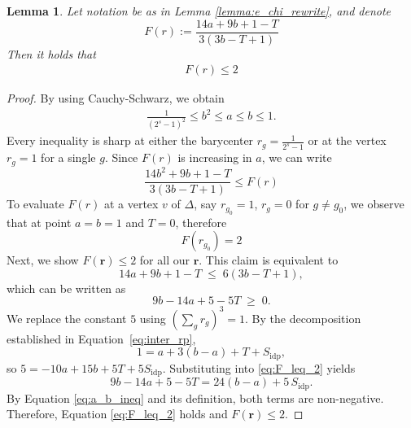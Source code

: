 \documentclass[12pt,twoside,]{amsart}
\theoremstyle{plain}
\newtheorem{lemma}[theorem]{Lemma}
\theoremstyle{definition}
\begin{document}
\begin{lemma}\label{lemma:inq_Fr}
Let notation be as in Lemma \ref{lemma:e_chi_rewrite}, 
and denote
\[
F(r):= \frac{14a+9b+1-T}{3(3b-T+1)}
\]
Then it holds that
 \begin{align*} 
F(r)
\leq 
2
 \end{align*}  
 \end{lemma}
\begin{proof}
By using Cauchy-Schwarz, we obtain 
\begin{align}\label{eq:a_b_ineq}
  \frac{1}{(2^s-1)^2} \leq b^2 \leq a \leq b \leq 1.
\end{align}
Every inequality is sharp at either the barycenter
$r_g = \frac{1}{2^s-1}$ or at the vertex 
$r_g =1 $ for a single $g$.
Since $F(r)$ is increasing in $a$, we can write
\[
\frac{14b^2+9b+1-T}{3(3b-T+1)} \leq F(r) 
\]
To evaluate $F(r)$ at a vertex $v$ of $\Delta$, say $r_{g_0}=1$, $r_g=0$ for $g\ne g_0$, we observe that at point $a = b =1$ and $T=0$, therefore
\[
F(r_{g_0}) = 2 
\]
Next, we show $F(\mathbf{r}) \leq 2$ for all our $\mathbf{r}$. This claim  is equivalent to
\[
14a + 9b + 1 - T \;\leq\; 6(3b - T + 1),
\]
which can be written as
\begin{equation}\label{eq:F_leq_2}
9b - 14a + 5 - 5T \;\geq\; 0.
\end{equation}
We replace the constant $5$ using $\left(\sum_{g} r_g\right)^3 = 1$. By the decomposition established in Equation~\eqref{eq:inter_rp},
\[
1 = a + 3(b - a) + T + S_{\mathrm{idp}},
\]
so $5 = -10a + 15b + 5T + 5S_{\mathrm{idp}}$. Substituting into \eqref{eq:F_leq_2} yields
\[
9b - 14a + 5 - 5T = 24(b - a) + 5\,S_{\mathrm{idp}}.
\]
By Equation \eqref{eq:a_b_ineq} and its definition, both terms are non-negative. Therefore, Equation \eqref{eq:F_leq_2} holds and $F(\mathbf{r}) \leq 2$. 
\end{proof}
\end{document}
